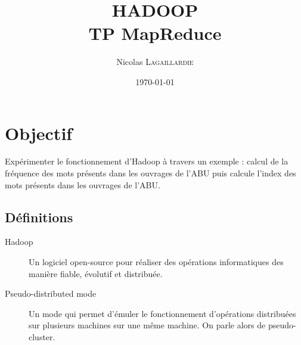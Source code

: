 \documentclass{article}
\title{HADOOP \\ TP MapReduce} %
\author{Nicolas \textsc{Lagaillardie}} %
\date{\today} %
\begin{document}
\maketitle %




\section{Objectif}

Exp\'{e}rimenter le fonctionnement d'Hadoop \`{a} travers un exemple : calcul de la fr\'{e}quence des mots pr\'{e}sents dans les ouvrages de l'ABU puis calcule l’index des mots pr\'{e}sents dans les ouvrages de l’ABU.



\subsection{D\'{e}finitions}
\label{definitions}
\begin{description}
\item[Hadoop]
Un logiciel open-source pour r\'{e}aliser des op\'{e}rations informatiques des mani\`{e}re fiable, \'{e}volutif et distribu\'{e}e.
\item[Pseudo-distributed mode]
Un mode qui permet d'\'{e}muler le fonctionnement d'op\'{e}rations distribu\'{e}es sur plusieurs machines sur une m\^{e}me machine. On parle alors de pseudo-cluster.
\end{description} 
 
\end{document}
